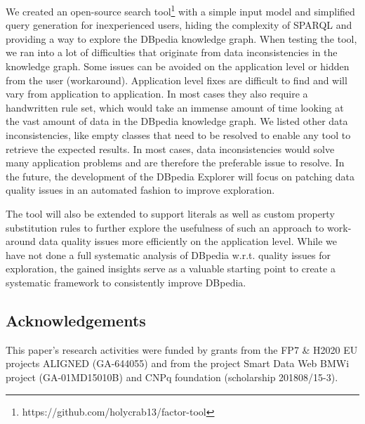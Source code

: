 \documentclass{sig-alternate}
\begin{document}
We created an open-source search tool\footnote{ https://github.com/holycrab13/factor-tool} with a simple input model and simpliﬁed query generation for inexperienced users, hiding the complexity of SPARQL and providing a way to explore the DBpedia knowledge graph. When testing the tool, we ran into a lot of diﬃculties that originate from data inconsistencies in the knowledge graph. Some issues can be avoided on the application level or hidden from the user (workaround). Application level ﬁxes are diﬃcult to ﬁnd and will vary from application to application. In most cases they also require a handwritten rule set, which would take an immense amount of time looking at the vast amount of data in the DBpedia knowledge graph. We listed other data inconsistencies, like empty classes that need to be resolved to enable any tool to retrieve the expected results. In most cases, data inconsistencies would solve many application problems and are therefore the preferable issue to resolve. In the future, the development of the DBpedia Explorer will focus on patching data quality issues in an automated fashion to improve exploration.

The tool will also be extended to support literals as well as custom property substitution rules to further explore the usefulness of such an approach to work-around data quality issues more eﬃciently on the application level. While we have not done a full systematic analysis of DBpedia w.r.t. quality issues for exploration, the gained insights serve as a valuable starting point to create a systematic framework to consistently improve DBpedia.

\subsection*{Acknowledgements}This paper's research activities were funded by grants from the FP7 \& H2020 EU projects ALIGNED (GA-644055) and from the project Smart Data Web BMWi project (GA-01MD15010B) and CNPq foundation (scholarship 201808/15-3).
\end{document}
